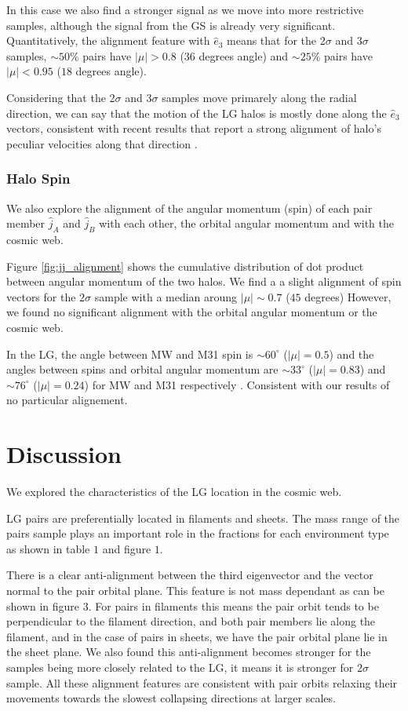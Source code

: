 \documentclass{emulateapj}
\begin{document}
In this case we also find a stronger signal as we move into more restrictive
samples, although the signal from the GS is already very
significant. Quantitatively, the alignment feature with $\hat{e}_3$
means that for the 2$\sigma$ and 3$\sigma$ samples, $\sim 50\%$ pairs
have $|\mu|>0.8$ ($36$ degrees angle) and $\sim 25\%$ pairs have
$|\mu|<0.95$ ($18$ degrees angle).

Considering that the 2$\sigma$ and 3$\sigma$ samples move primarely
along the radial direction, we can say that the motion of the LG
halos is mostly done along the $\hat{e}_3$ vectors, consistent with
recent results that report a strong alignment of halo's peculiar
velocities along that direction \citep{ForeroRomero2014}.


\subsubsection{Halo Spin}

We also explore the alignment of the  angular momentum (spin) of each pair
member $\hat{j}_A$ and $\hat{j}_B$ with each other, the orbital
angular momentum and with the cosmic web. 

Figure \ref{fig:jj_alignment} shows the cumulative distribution of dot
product between angular momentum of the  two halos. We find a a slight alignment
of spin vectors for the $2\sigma$ sample with a median aroung
$|\mu|\sim 0.7$ ($45$ degrees) However, we found no significant
alignment with the orbital angular momentum or the cosmic web.  
 
In the LG, the angle between MW and M31 spin is $\sim60^{\circ}$
($|\mu|=0.5$) and the angles between spins and orbital angular
momentum are $\sim33^{\circ}$ ($|\mu|=0.83$) and $\sim76^{\circ}$
($|\mu|=0.24$) for MW and M31 respectively
\citep{2012ApJ...753....9V}. Consistent with our results of no particular
alignement.

\section{Discussion}
\label{sec:discussion}

We explored the characteristics of the LG location in the cosmic web.

LG pairs are preferentially located in filaments and sheets. The mass range
of the pairs sample plays an important role in the fractions for each environment
type as shown in table $1$ and figure $1$.

There is a clear anti-alignment between the third eigenvector and the vector normal 
to the pair orbital plane. This feature is not mass dependant as can be shown in
figure $3$.
For pairs in filaments this means the pair orbit tends to be perpendicular to the 
filament direction, and both pair members lie along the filament, and in the case 
of pairs in sheets, we have the pair orbital plane lie in the sheet plane.
We also found this anti-alignment becomes stronger for the samples being more 
closely related to the LG, it means it is stronger for $2\sigma$ sample.
All these alignment features are consistent with pair orbits relaxing their 
movements towards the slowest collapsing directions at larger scales.
\end{document}
